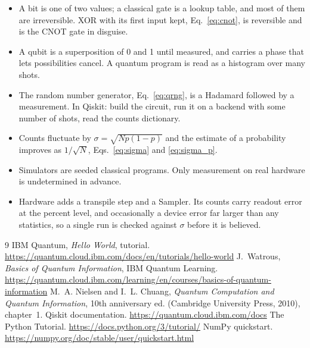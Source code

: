 \documentclass[11pt]{article}
\begin{document}
\begin{itemize}
\item A bit is one of two values; a classical gate is a lookup table, and most of them are irreversible. XOR with its first input kept, Eq.~\eqref{eq:cnot}, is reversible and is the CNOT gate in disguise.
\item A qubit is a superposition of 0 and 1 until measured, and carries a phase that lets possibilities cancel. A quantum program is read as a histogram over many shots.
\item The random number generator, Eq.~\eqref{eq:qrng}, is a Hadamard followed by a measurement. In Qiskit: build the circuit, run it on a backend with some number of shots, read the counts dictionary.
\item Counts fluctuate by $\sigma = \sqrt{Np(1-p)}$ and the estimate of a probability improves as $1/\sqrt N$, Eqs.~\eqref{eq:sigma} and \eqref{eq:sigma_p}.
\item Simulators are seeded classical programs. Only measurement on real hardware is undetermined in advance.
\item Hardware adds a transpile step and a Sampler. Its counts carry readout error at the percent level, and occasionally a device error far larger than any statistics, so a single run is checked against $\sigma$ before it is believed.
\end{itemize}

\begin{thebibliography}{9}
 IBM Quantum, \emph{Hello World}, tutorial. \url{https://quantum.cloud.ibm.com/docs/en/tutorials/hello-world}
 J.~Watrous, \emph{Basics of Quantum Information}, IBM Quantum Learning. \url{https://quantum.cloud.ibm.com/learning/en/courses/basics-of-quantum-information}
 M.~A. Nielsen and I.~L. Chuang, \emph{Quantum Computation and Quantum Information}, 10th anniversary ed. (Cambridge University Press, 2010), chapter~1.
 Qiskit documentation. \url{https://quantum.cloud.ibm.com/docs}
 The Python Tutorial. \url{https://docs.python.org/3/tutorial/}
 NumPy quickstart. \url{https://numpy.org/doc/stable/user/quickstart.html}
\end{thebibliography}
\end{document}
